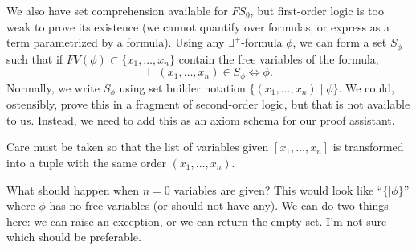 \begin{node}
We also have set comprehension available for $FS_{0}$, but first-order
logic is too weak to prove its existence (we cannot quantify over
formulas, or express as a term parametrized by a formula). Using
any $\exists^{+}$-formula $\phi$, we can form a set $S_{\phi}$ such
that if $FV(\phi)\subset\{x_{1},\dots,x_{n}\}$ contain the free
variables of the formula,
\begin{equation}
\vdash(x_{1},\dots,x_{n})\in S_{\phi}\iff\phi.
\end{equation}
Normally, we write $S_{\phi}$ using set builder notation $\{(x_{1},\dots,x_{n})\mid\phi\}$.
We could, ostensibly, prove this in a fragment of second-order logic,
but that is not available to us. Instead, we need to add this as an
axiom schema for our proof assistant.

Care must be taken so that the list of variables given $[x_{1},\dots,x_{n}]$
is transformed into a tuple with the same order $(x_{1},\dots,x_{n})$.

What should happen when $n=0$ variables are given? This would look
like ``$\{\mid\phi\}$'' where $\phi$ has no free variables (or should not
have any). We can do two things here: we can raise an exception, or we
can return the empty set. I'm not sure which should be preferable.
\end{node}

